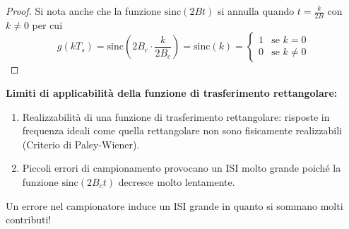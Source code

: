 \begin{enumerate}
          \begin{proof}
                  Si nota anche che la funzione $\text{sinc}(2Bt)$ si annulla quando $t = \frac{k}{2B}$ con $k \neq 0$ per cui
              \[
                  g(kT_s) = \text{sinc} \left(2B_c\cdot\frac{k}{2B_c}\right) = \text{sinc}(k) =
                  \begin{cases}
                      1 & \text{se } k=0    \\
                      0 & \text{se } k\neq0
                  \end{cases}
              \]
          \end{proof}

\end{enumerate}


\textbf{Limiti di applicabilità della funzione di trasferimento rettangolare:}

\begin{enumerate}
    \item Realizzabilità di una funzione di trasferimento rettangolare: risposte in frequenza ideali come quella rettangolare non sono fisicamente realizzabili (Criterio di Paley-Wiener).
    \item Piccoli errori di campionamento provocano un ISI molto grande poiché la funzione $\text{sinc}(2B_ct)$ decresce molto lentamente.
\end{enumerate}

Un errore nel campionatore induce un ISI grande in quanto si sommano molti contributi!




